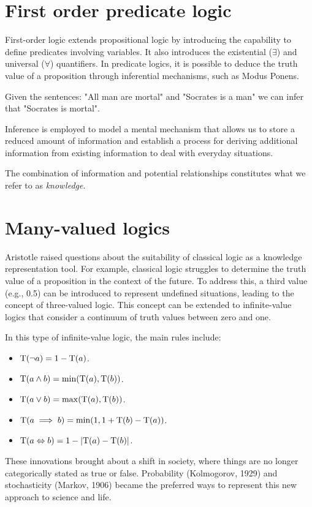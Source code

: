\documentclass[12pt, a4paper]{report}
\begin{document}
    \section{First order predicate logic}
    First-order logic extends propositional logic by introducing the capability to define predicates involving variables. 
    It also introduces the existential ($\exists$) and universal ($\forall$) quantifiers.
    In predicate logics, it is possible to deduce the truth value of a proposition through inferential mechanisms, such as Modus Ponens.
    \begin{example}
        Given the sentences: "All man are mortal" and "Socrates is a man" we can infer that "Socrates is mortal".
    \end{example}
    Inference is employed to model a mental mechanism that allows us to store a reduced amount of information and establish a process for deriving additional information from existing information to deal with everyday situations.
    \begin{definition}
        The combination of information and potential relationships constitutes what we refer to as \emph{knowledge}.
    \end{definition}

    \section{Many-valued logics}
    Aristotle raised questions about the suitability of classical logic as a knowledge representation tool.
    For example, classical logic struggles to determine the truth value of a proposition in the context of the future.
    To address this, a third value (e.g., 0.5) can be introduced to represent undefined situations, leading to the concept of three-valued logic. 
    This concept can be extended to infinite-value logics that consider a continuum of truth values between zero and one.

    \begin{example}
        In this type of infinite-value logic, the main rules include:
        \begin{itemize}
            \item $\textnormal{T}(\lnot a)=1-\textnormal{T}(a)$.
            \item $\textnormal{T}(a \land b)=\min (\textnormal{T}(a),\textnormal{T}(b))$.
            \item $\textnormal{T}(a \lor b)=\max (\textnormal{T}(a),\textnormal{T}(b))$.
            \item $\textnormal{T}(a \implies b)=\min (1, 1+\textnormal{T}(b)-\textnormal{T}(a))$.
            \item $\textnormal{T}(a \Leftrightarrow b)=1-\left\lvert \textnormal{T}(a)-\textnormal{T}(b) \right\rvert$.
        \end{itemize}
    \end{example}
    These innovations brought about a shift in society, where things are no longer categorically stated as true or false. 
    Probability (Kolmogorov, 1929) and stochasticity (Markov, 1906) became the preferred ways to represent this new approach to science and life.
\end{document}
